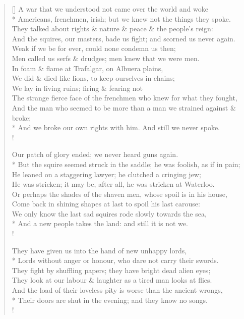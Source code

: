 \documentclass[MAIN]{subfiles}
\begin{document}
\begin{verse}[\versewidth]
A war that we understood not came over the world and woke\\*
Americans, frenchmen, irish; but we knew not the things they spoke.\\
They talked about rights \& nature \& peace \& the people's reign:\\
And the squires, our masters, bade us fight; and scorned us never again.\\
Weak if we be for ever, could none condemn us then;\\
Men called us serfs \& drudges; men knew that we were men.\\
In foam \& flame at {\sc Trafalgar}, on {\sc Albuera} plains,\\
We did \& died like lions, to keep ourselves in chains;\\
We lay in living ruins; firing \& fearing not\\
The strange fierce face of the frenchmen who knew for what they fought,\\
And the man who seemed to be more than a man we strained against \& broke;\\*
And we broke our own rights with him. And still we never spoke.\\!

Our patch of glory ended; we never heard guns again.\\*
But the squire seemed struck in the saddle; he was foolish, as if in pain;\\
He leaned on a staggering lawyer; he clutched a cringing jew;\\
He was stricken; it may be, after all, he was stricken at {\sc Waterloo}.\\
Or perhaps the shades of the shaven men, whose spoil is in his house,\\
Come back in shining shapes at last to spoil his last carouse:\\
We only know the last sad squires rode slowly towards the sea,\\*
And a new people takes the land: and still it is not we.\\!

They have given us into the hand of new unhappy lords,\\*
Lords without anger or honour, who dare not carry their swords.\\
They fight by shuffling papers; they have bright dead alien eyes;\\
They look at our labour \& laughter as a tired man looks at flies.\\
And the load of their loveless pity is worse than the ancient wrongs,\\*
Their doors are shut in the evening; and they know no songs.\\!


\end{verse}
\end{document}
